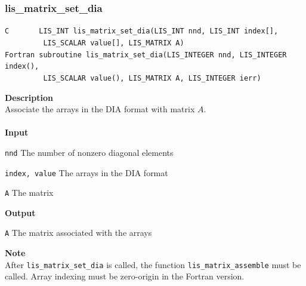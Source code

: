 \documentclass[a4paper]{article}
\newcommand{\namelistlabel}[1]{\mbox{#1}\hfill}
\newenvironment{namelist}[1]{%
\begin{list}{}
  {\let\makelabel\namelistlabel
  \settowidth{\labelwidth}{#1}
  \setlength{\leftmargin}{1.1\labelwidth}}
  }{%
\end{list}}
\begin{document}
\subsubsection{lis\_matrix\_set\_dia}
\begin{screen}
\verb|C       LIS_INT lis_matrix_set_dia(LIS_INT nnd, LIS_INT index[],|\\
\verb|         LIS_SCALAR value[], LIS_MATRIX A)|\\
\verb|Fortran subroutine lis_matrix_set_dia(LIS_INTEGER nnd, LIS_INTEGER index(), |\\
\verb|         LIS_SCALAR value(), LIS_MATRIX A, LIS_INTEGER ierr)|
\end{screen}
{\bf Description}\\
\indent
Associate the arrays in the DIA format with matrix $A$.
\\ \\
\noindent
{\bf Input}
\begin{namelist}{XXXXXXXXXXXXXXXXXXXX}
\item[\tt nnd] The number of nonzero diagonal elements
\item[\tt index, value] The arrays in the DIA format
\item[\tt A] The matrix
\end{namelist}
{\bf Output}
\begin{namelist}{XXXXXXXXXXXXXXXXXXXX}
\item[\tt A] The matrix associated with the arrays 
\end{namelist}
\noindent
{\bf Note}\\
\indent
After \verb|lis_matrix_set_dia| is called, 
the function \verb|lis_matrix_assemble| must be called. 
Array indexing must be zero-origin in the Fortran version.

\newpage
\end{document}
